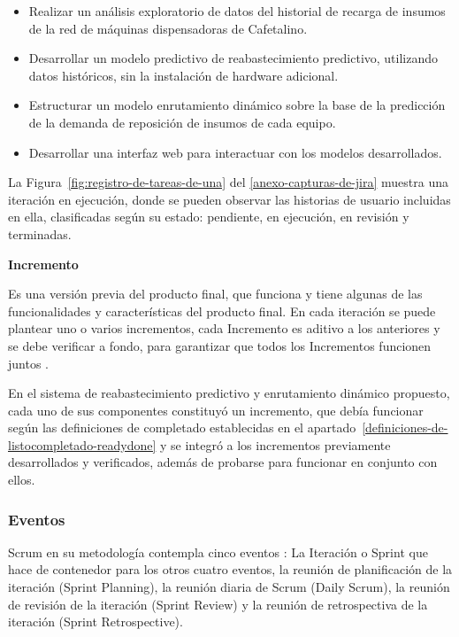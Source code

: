 \begin{itemize}
\item
  Realizar un análisis exploratorio de datos del historial de recarga de insumos de la red de máquinas dispensadoras de Cafetalino.
\item
  Desarrollar un modelo predictivo de reabastecimiento predictivo, utilizando datos históricos, sin la instalación de hardware adicional.
\item
  Estructurar un modelo enrutamiento dinámico sobre la base de la predicción de la demanda de reposición de insumos de cada equipo.
\item
  Desarrollar una interfaz web para interactuar con los modelos desarrollados.
\end{itemize}

La Figura~\ref{fig:registro-de-tareas-de-una} del \ref{anexo-capturas-de-jira} muestra una iteración en ejecución, donde se pueden observar las historias de usuario incluidas en ella, clasificadas según su estado: pendiente, en ejecución, en revisión y terminadas.

\textbf{Incremento}

Es una versión previa del producto final, que funciona y tiene algunas de las funcionalidades y características del producto final. En cada iteración se puede plantear uno o varios incrementos, cada Incremento es aditivo a los anteriores y se debe verificar a fondo, para garantizar que todos los Incrementos funcionen juntos \citep{schwaber2020}.

En el sistema de reabastecimiento predictivo y enrutamiento dinámico propuesto, cada uno de sus componentes constituyó un incremento, que debía funcionar según las definiciones de completado establecidas en el apartado~\ref{definiciones-de-listocompletado-readydone} y se integró a los incrementos previamente desarrollados y verificados, además de probarse para funcionar en conjunto con ellos.

\subsubsection{Eventos}\label{eventos}

Scrum en su metodología contempla cinco eventos \citep{schwaber2020}: La Iteración o Sprint que hace de contenedor para los otros cuatro eventos, la reunión de planificación de la iteración (Sprint Planning), la reunión diaria de Scrum (Daily Scrum), la reunión de revisión de la iteración (Sprint Review) y la reunión de retrospectiva de la iteración (Sprint Retrospective).

